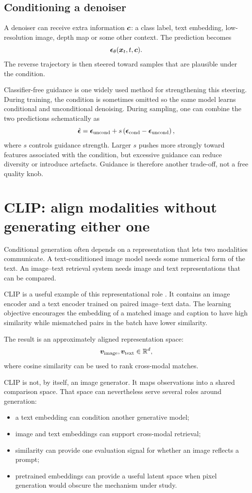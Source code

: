 \subsection{Conditioning a denoiser}

A denoiser can receive extra information \(\bm{c}\): a class label, text embedding, low-resolution image, depth map or some other context. The prediction becomes
\[
  \bm{\epsilon}_\theta(\bm{x}_t,t,\bm{c}).
\]
The reverse trajectory is then steered toward samples that are plausible under the condition.

Classifier-free guidance is one widely used method for strengthening this steering. During training, the condition is sometimes omitted so the same model learns conditional and unconditional denoising. During sampling, one can combine the two predictions schematically as
\[
  \hat{\bm{\epsilon}}
  = \bm{\epsilon}_{\mathrm{uncond}}
    + s\left(
       \bm{\epsilon}_{\mathrm{cond}}
       - \bm{\epsilon}_{\mathrm{uncond}}
      \right),
\]
where \(s\) controls guidance strength. Larger \(s\) pushes more strongly toward features associated with the condition, but excessive guidance can reduce diversity or introduce artefacts. Guidance is therefore another trade-off, not a free quality knob.

\section{CLIP: align modalities without generating either one}

Conditional generation often depends on a representation that lets two modalities communicate. A text-conditioned image model needs some numerical form of the text. An image--text retrieval system needs image and text representations that can be compared.

CLIP is a useful example of this representational role \parencite{radford2021clip}. It contains an image encoder and a text encoder trained on paired image--text data. The learning objective encourages the embedding of a matched image and caption to have high similarity while mismatched pairs in the batch have lower similarity.

The result is an approximately aligned representation space:
\[
  \bm{v}_{\mathrm{image}},\bm{v}_{\mathrm{text}}\in\mathbb{R}^d,
\]
where cosine similarity can be used to rank cross-modal matches.

CLIP is not, by itself, an image generator. It maps observations into a shared comparison space. That space can nevertheless serve several roles around generation:
\begin{itemize}[leftmargin=*]
  \item a text embedding can condition another generative model;
  \item image and text embeddings can support cross-modal retrieval;
  \item similarity can provide one evaluation signal for whether an image reflects a prompt;
  \item pretrained embeddings can provide a useful latent space when pixel generation would obscure the mechanism under study.
\end{itemize}

